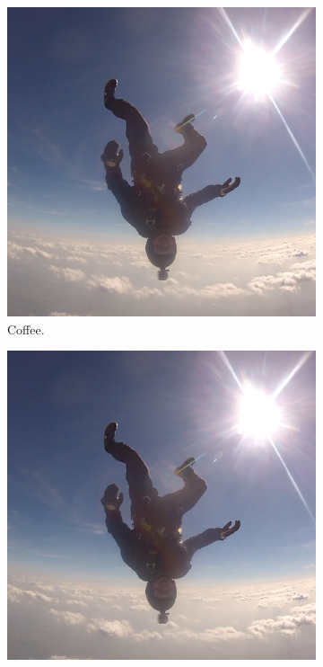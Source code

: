 \documentclass{article}
\begin{document}
\begin{figure}[h!]
  \centering
  \begin{subfigure}[b]{0.2\linewidth}
    \includegraphics[width=\linewidth]{head-down.png}
     \caption{Coffee.}
  \end{subfigure}
  \begin{subfigure}[b]{0.2\linewidth}
    \includegraphics[width=\linewidth]{head-down.png}

\end{subfigure}
\end{figure}
\end{document}
